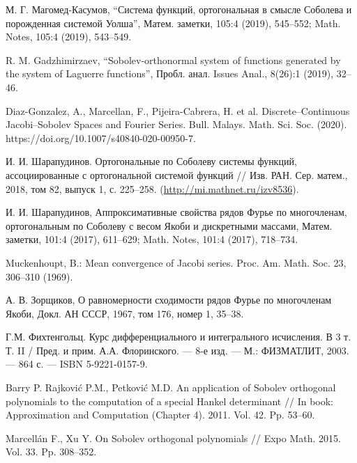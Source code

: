 \begin{thebibliography}{111}
	
	
	
	М. Г. Магомед-Касумов, “Система функций, ортогональная в смысле Соболева и порожденная системой Уолша”, Матем. заметки, 105:4 (2019), 545–552; Math. Notes, 105:4 (2019), 543–549.
	
	
	
	
	R. M. Gadzhimirzaev, “Sobolev-orthonormal system of functions generated by the system of Laguerre functions”, Пробл. анал. Issues Anal., 8(26):1 (2019), 32–46.
	
	
	
	
	Diaz-Gonzalez, A., Marcellan, F., Pijeira-Cabrera, H. et al. Discrete–Continuous Jacobi–Sobolev Spaces and Fourier Series. Bull. Malays. Math. Sci. Soc. (2020). https://doi.org/10.1007/s40840-020-00950-7.
	
	
	
	
	
	И. И. Шарапудинов. Ортогональные по Соболеву системы функций, ассоциированные с ортогональной системой функций // Изв. РАН. Сер. матем., 2018, том 82, выпуск 1, с. 225--258. (\url{http://mi.mathnet.ru/izv8536}).  	
	
	
	
	
	И. И. Шарапудинов, Аппроксимативные свойства рядов Фурье по многочленам, ортогональным по Соболеву с весом Якоби и дискретными массами, Матем. заметки, 101:4 (2017), 611–629; Math. Notes, 101:4 (2017), 718–734.
	
	Muckenhoupt, B.: Mean convergence of Jacobi series. Proc. Am. Math. Soc. 23, 306–310 (1969).
	
	
	А. В. Зорщиков, О равномерности сходимости рядов Фурье по многочленам Якоби, Докл. АН СССР, 1967, том 176, номер 1, 35–38.
	
	
	Г.М. Фихтенгольц. Курс дифференциального и интегрального исчисления. В 3 т. Т. II / Пред. и прим. А.А. Флоринского. --- 8-е изд. --- М.: ФИЗМАТЛИТ, 2003. --- 864 с. --- ISBN 5-9221-0157-9.


{Barry P. Rajkovi\'c P.M., Petkovi\'c M.D.} An application of Sobolev orthogonal polynomials to the computation of a special Hankel determinant // In book: Approximation and Computation (Chapter 4). 2011. Vol. 42. Pp. 53--60.

{Marcell\'an F., Xu Y.} On Sobolev orthogonal polynomials // Expo Math. 2015. Vol. 33. Pp. 308--352.


\end{thebibliography}
